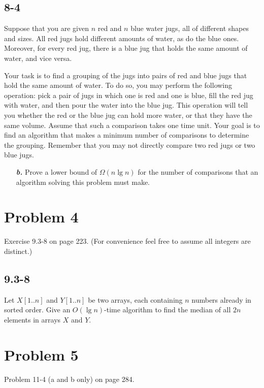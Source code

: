 \documentclass{../../class}
\begin{document}
\subsection*{8-4}
Suppose that you are given $n$ red and $n$ blue water jugs, all of different shapes and sizes. All red jugs hold different amounts of water, as do the blue ones. Moreover, for every red jug, there is a blue jug that holds the same amount of water, and vice versa.

Your task is to find a grouping of the jugs into pairs of red and blue jugs that hold the same amount of water. To do so, you may perform the following operation: pick a pair of jugs in which one is red and one is blue, fill the red jug with water, and then pour the water into the blue jug. This operation will tell you whether the red or the blue jug can hold more water, or that they have the same volume. Assume that such a comparison takes one time unit. Your goal is to find an algorithm that makes a minimum number of comparisons to determine the grouping. Remember that you may not directly compare two red jugs or two blue jugs.
\begin{itemize}
    \item[\textbf{\textit{b.}}] Prove a lower bound of $\Omega(n\lg{n})$ for the number of comparisons that an algorithm solving this problem must make.
\end{itemize}

\newpage
\section*{Problem 4}
\begin{tcolorbox}
    Exercise 9.3-8 on page 223. (For convenience feel free to assume all integers are distinct.)
\end{tcolorbox}

\subsection*{9.3-8}
Let $X[1..n]$ and $Y[1..n]$ be two arrays, each containing $n$ numbers already in sorted order. Give an $O(\lg{n})$-time algorithm to find the median of all $2n$ elements in arrays $X$ and $Y$.

\newpage
\section*{Problem 5}
\begin{tcolorbox}
    Problem 11-4 (a and b only) on page 284.
\end{tcolorbox}
\end{document}
